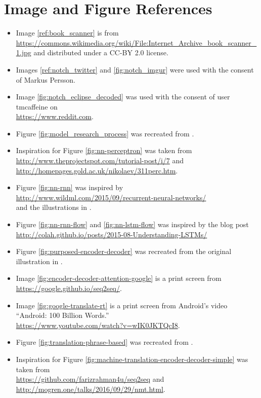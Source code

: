 
\chapter{Image and Figure References}

\begin{itemize}
    \item Image \ref{ref:book_scanner} is from \url{https://commons.wikimedia.org/wiki/File:Internet_Archive_book_scanner_1.jpg} and distributed under a CC-BY 2.0 license.
    \item Images \ref{ref:notch_twitter} and \ref{fig:notch_imgur} were used with the consent of Markus Persson.
    \item Image \ref{fig:notch_eclipse_decoded} was used with the consent of user tmcaffeine on \\ \url{https://www.reddit.com}.
    \item Figure \ref{fig:model_research_process} was recreated from \cite{oates2005researching}.
    \item Inspiration for Figure \ref{fig:nn-perceptron} was taken from\\\url{http://www.theprojectspot.com/tutorial-post/i/7} and \\ \url{http://homepages.gold.ac.uk/nikolaev/311perc.htm}.
    \item Figure \ref{fig:nn-rnn} was inspired by \\ \url{http://www.wildml.com/2015/09/recurrent-neural-networks/} \\ and the illustrations in \cite{goodfellow2016deeplearning}.
    \item Figure \ref{fig:nn-rnn-flow} and \ref{fig:nn-lstm-flow} was inspired by the blog post \\ \url{http://colah.github.io/posts/2015-08-Understanding-LSTMs/}
    \item Figure \ref{fig:purposed-encoder-decoder} was recreated from the original illustration in  \cite{cho2014learning}.
    \item Image \ref{fig:encoder-decoder-attention-google} is a print screen from \url{https://google.github.io/seq2seq/}.
    \item Image \ref{fig:google-translate-rt} is a print screen from Android's video ``Android: 100 Billion Words.'' \\ \url{https://www.youtube.com/watch?v=wIK0JKTQcI8}.
    \item Figure \ref{fig:translation-phrase-based} was recreated from \cite{koehn2010statistical}.
    \item Inspiration for Figure \ref{fig:machine-translation-encoder-decoder-simple} was taken from \\ \url{https://github.com/farizrahman4u/seq2seq} and\\\url{http://mogren.one/talks/2016/09/29/nmt.html}.
\end{itemize}